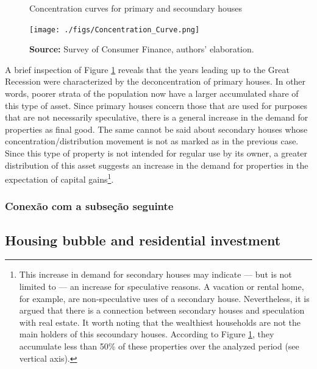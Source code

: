 \documentclass[11pt]{article}
\begin{document}
\begin{figure}[htb]
    \centering
        \caption{Concentration curves for primary and secoundary houses} 
    \texttt{[image: ./figs/Concentration\_Curve.png]}
    \label{fig:concentration}
    \caption*{\textbf{Source:} Survey of Consumer Finance, authors’ elaboration.}
\end{figure}


A brief inspection of Figure \ref{fig:concentration} reveals that the years leading up to the Great Recession were characterized by the deconcentration of primary houses. In other words, poorer strata of the population now have a larger accumulated share of this type of asset. 
Since primary houses concern those that are used for purposes that are not necessarily speculative, there is a general increase in the demand for properties as final good. The same cannot be said about secondary houses whose concentration/distribution movement is not as marked as in the previous case. Since this type of property is not intended for regular use by its owner, a greater distribution of this asset suggests an increase in the demand for properties in the expectation of capital gains\footnote{This increase in demand for secondary houses may indicate --- but is not limited to --- an increase for speculative reasons. A vacation or rental home, for example, are non-speculative uses of a secondary house. Nevertheless, it is argued that there is a connection between secondary houses and speculation with real estate. It worth noting that the wealthiest households are not the main holders of this secoundary houses. According to Figure \ref{fig:concentration}, they accumulate less than 50\% of these properties over the analyzed period (see vertical axis).}.

\subsubsection{Conexão com a subseção seguinte}
\label{sec:orgc8af542}


\subsection{Housing bubble and residential investment}
\label{sec:org915a456}
\end{document}
